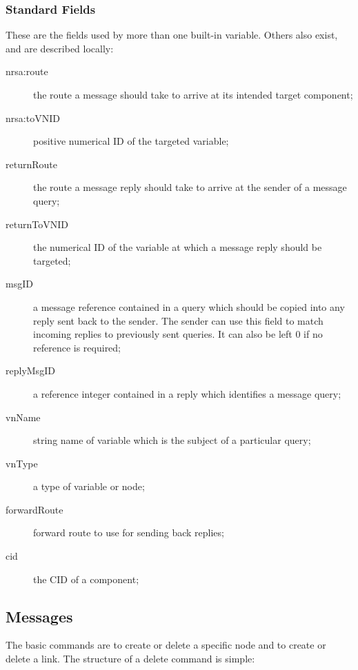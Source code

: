 \documentclass[pdftex,a4paper]{article}
\begin{document}
\subsubsection{Standard Fields}

These are the fields used by more than one built-in variable. Others
also exist, and are described locally:

\begin{description}

\item[nrsa:route] the route a message should take to arrive at its
  intended target component;

\item[nrsa:toVNID] positive numerical ID of the targeted variable;

\item[returnRoute] the route a message reply should take to
  arrive at the sender of a message query;

\item[returnToVNID] the numerical ID of the variable at which
  a message reply should be targeted;

\item[msgID] a message reference contained in a query which
  should be copied into any reply sent back to the sender. The sender
  can use this field to match incoming replies to previously sent
  queries. It can also be left 0 if no reference is required;

\item[replyMsgID] a reference integer contained in a reply
  which identifies a message query;

\item[vnName] string name of variable which is the subject of
  a particular query;

\item[vnType] a type of variable or node;

\item[forwardRoute] forward route to use for sending back
      replies;

\item[cid] the CID of a component;

\end{description}

\subsection{Messages}

The basic commands are to create or delete a specific node and to
create or delete a link. The structure of a delete command is simple:
\end{document}
